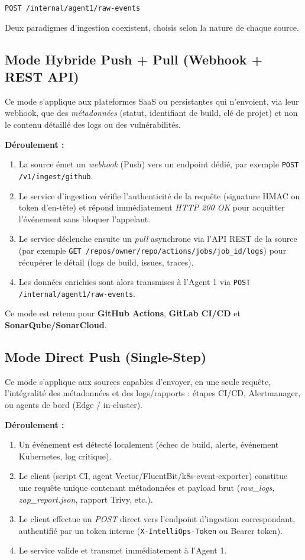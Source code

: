 \documentclass[12pt,a4paper]{article}
\newcommand{\code}[1]{\texttt{#1}}
\begin{document}
\begin{center}
\code{POST /internal/agent1/raw-events}
\end{center}

Deux paradigmes d'ingestion coexistent, choisis selon la nature de chaque source.

\subsection{Mode Hybride Push + Pull (Webhook + REST API)}

Ce mode s'applique aux plateformes SaaS ou persistantes qui n'envoient, via leur webhook, que des \emph{métadonnées} (statut, identifiant de build, clé de projet) et non le contenu détaillé des logs ou des vulnérabilités.

\textbf{Déroulement :}
\begin{enumerate}
  \item La source émet un \emph{webhook} (Push) vers un endpoint dédié, par exemple \code{POST /v1/ingest/github}.
  \item Le service d'ingestion vérifie l'authenticité de la requête (signature HMAC ou token d'en-tête) et répond immédiatement \emph{HTTP 200 OK} pour acquitter l'événement sans bloquer l'appelant.
  \item Le service déclenche ensuite un \emph{pull} asynchrone via l'API REST de la source (par exemple \code{GET /repos/{owner}/{repo}/actions/jobs/{job\_id}/logs}) pour récupérer le détail (logs de build, issues, traces).
  \item Les données enrichies sont alors transmises à l'Agent 1 via \code{POST /internal/agent1/raw-events}.
\end{enumerate}

Ce mode est retenu pour \textbf{GitHub Actions}, \textbf{GitLab CI/CD} et \textbf{SonarQube/SonarCloud}.

\subsection{Mode Direct Push (Single-Step)}

Ce mode s'applique aux sources capables d'envoyer, en une seule requête, l'intégralité des métadonnées et des logs/rapports : étapes CI/CD, Alertmanager, ou agents de bord (Edge / in-cluster).

\textbf{Déroulement :}
\begin{enumerate}
  \item Un événement est détecté localement (échec de build, alerte, événement Kubernetes, log critique).
  \item Le client (script CI, agent Vector/FluentBit/k8s-event-exporter) constitue une requête unique contenant métadonnées et payload brut (\emph{raw\_logs}, \emph{zap\_report.json}, rapport Trivy, etc.).
  \item Le client effectue un \emph{POST} direct vers l'endpoint d'ingestion correspondant, authentifié par un token interne (\code{X-IntelliOps-Token} ou Bearer token).
  \item Le service valide et transmet immédiatement à l'Agent 1.
\end{enumerate}
\end{document}

